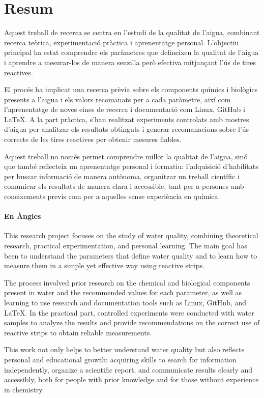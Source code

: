 \chapter*{Resum}
Aquest treball de recerca se centra en l'estudi de la qualitat de l'aigua, combinant recerca teòrica, experimentació pràctica i aprenentatge personal. L'objectiu principal ha estat comprendre els paràmetres que defineixen la qualitat de l'aigua i aprendre a mesurar-los de manera senzilla però efectiva mitjançant l'ús de tires reactives.

El procés ha implicat una recerca prèvia sobre els components químics i biològics presents a l'aigua i els valors recomanats per a cada paràmetre, així com l'aprenentatge de noves eines de recerca i documentació com Linux, GitHub i LaTeX. A la part pràctica, s'han realitzat experiments controlats amb mostres d'aigua per analitzar els resultats obtinguts i generar recomanacions sobre l'ús correcte de les tires reactives per obtenir mesures fiables.

Aquest treball no només permet comprendre millor la qualitat de l'aigua, sinó que també reflecteix un aprenentatge personal i formatiu: l'adquisició d'habilitats per buscar informació de manera autònoma, organitzar un treball científic i comunicar els resultats de manera clara i accessible, tant per a persones amb coneixements previs com per a aquelles sense experiència en química.

\subsubsection{En Àngles}
This research project focuses on the study of water quality, combining theoretical research, practical experimentation, and personal learning. The main goal has been to understand the parameters that define water quality and to learn how to measure them in a simple yet effective way using reactive strips.

The process involved prior research on the chemical and biological components present in water and the recommended values for each parameter, as well as learning to use research and documentation tools such as Linux, GitHub, and LaTeX. In the practical part, controlled experiments were conducted with water samples to analyze the results and provide recommendations on the correct use of reactive strips to obtain reliable measurements.

This work not only helps to better understand water quality but also reflects personal and educational growth: acquiring skills to search for information independently, organize a scientific report, and communicate results clearly and accessibly, both for people with prior knowledge and for those without experience in chemistry.
